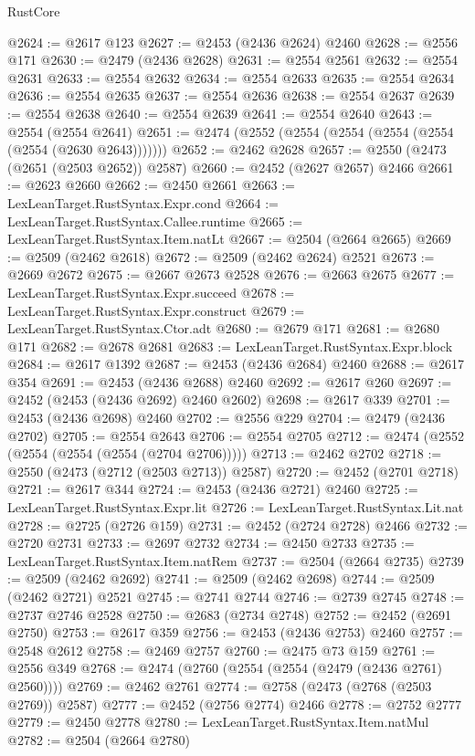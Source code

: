 \begin{lexlean}{RustCore}
\begin{coremodule}
@2624 := @2617 @123
@2627 := @2453 (@2436 @2624) @2460
@2628 := @2556 @171
@2630 := @2479 (@2436 @2628)
@2631 := @2554 @2561
@2632 := @2554 @2631
@2633 := @2554 @2632
@2634 := @2554 @2633
@2635 := @2554 @2634
@2636 := @2554 @2635
@2637 := @2554 @2636
@2638 := @2554 @2637
@2639 := @2554 @2638
@2640 := @2554 @2639
@2641 := @2554 @2640
@2643 := @2554 (@2554 @2641)
@2651 := @2474 (@2552 (@2554 (@2554 (@2554 (@2554 (@2554 (@2630 @2643)))))))
@2652 := @2462 @2628
@2657 := @2550 (@2473 (@2651 (@2503 @2652)) @2587)
@2660 := @2452 (@2627 @2657) @2466
@2661 := @2623 @2660
@2662 := @2450 @2661
@2663 := LexLeanTarget.RustSyntax.Expr.cond
@2664 := LexLeanTarget.RustSyntax.Callee.runtime
@2665 := LexLeanTarget.RustSyntax.Item.natLt
@2667 := @2504 (@2664 @2665)
@2669 := @2509 (@2462 @2618)
@2672 := @2509 (@2462 @2624) @2521
@2673 := @2669 @2672
@2675 := @2667 @2673 @2528
@2676 := @2663 @2675
@2677 := LexLeanTarget.RustSyntax.Expr.succeed
@2678 := LexLeanTarget.RustSyntax.Expr.construct
@2679 := LexLeanTarget.RustSyntax.Ctor.adt
@2680 := @2679 @171
@2681 := @2680 @171
@2682 := @2678 @2681
@2683 := LexLeanTarget.RustSyntax.Expr.block
@2684 := @2617 @1392
@2687 := @2453 (@2436 @2684) @2460
@2688 := @2617 @354
@2691 := @2453 (@2436 @2688) @2460
@2692 := @2617 @260
@2697 := @2452 (@2453 (@2436 @2692) @2460 @2602)
@2698 := @2617 @339
@2701 := @2453 (@2436 @2698) @2460
@2702 := @2556 @229
@2704 := @2479 (@2436 @2702)
@2705 := @2554 @2643
@2706 := @2554 @2705
@2712 := @2474 (@2552 (@2554 (@2554 (@2554 (@2704 @2706)))))
@2713 := @2462 @2702
@2718 := @2550 (@2473 (@2712 (@2503 @2713)) @2587)
@2720 := @2452 (@2701 @2718)
@2721 := @2617 @344
@2724 := @2453 (@2436 @2721) @2460
@2725 := LexLeanTarget.RustSyntax.Expr.lit
@2726 := LexLeanTarget.RustSyntax.Lit.nat
@2728 := @2725 (@2726 @159)
@2731 := @2452 (@2724 @2728) @2466
@2732 := @2720 @2731
@2733 := @2697 @2732
@2734 := @2450 @2733
@2735 := LexLeanTarget.RustSyntax.Item.natRem
@2737 := @2504 (@2664 @2735)
@2739 := @2509 (@2462 @2692)
@2741 := @2509 (@2462 @2698)
@2744 := @2509 (@2462 @2721) @2521
@2745 := @2741 @2744
@2746 := @2739 @2745
@2748 := @2737 @2746 @2528
@2750 := @2683 (@2734 @2748)
@2752 := @2452 (@2691 @2750)
@2753 := @2617 @359
@2756 := @2453 (@2436 @2753) @2460
@2757 := @2548 @2612
@2758 := @2469 @2757
@2760 := @2475 @73 @159
@2761 := @2556 @349
@2768 := @2474 (@2760 (@2554 (@2554 (@2479 (@2436 @2761) @2560))))
@2769 := @2462 @2761
@2774 := @2758 (@2473 (@2768 (@2503 @2769)) @2587)
@2777 := @2452 (@2756 @2774) @2466
@2778 := @2752 @2777
@2779 := @2450 @2778
@2780 := LexLeanTarget.RustSyntax.Item.natMul
@2782 := @2504 (@2664 @2780)

\end{coremodule}
\end{lexlean}
